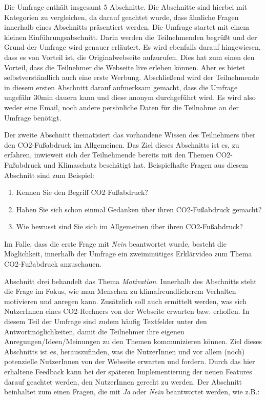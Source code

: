 Die Umfrage enthält insgesamt 5 Abschnitte.
Die Abschnitte sind hierbei mit Kategorien zu vergleichen, da darauf geachtet wurde, dass ähnliche Fragen innerhalb eines Abschnitts präsentiert werden.
Die Umfrage startet mit einem kleinen Einführungsabschnitt.
Darin werden die Teilnehmenden begrüßt und der Grund der Umfrage wird genauer erläutert.
Es wird ebenfalls darauf hingewiesen, dass es von Vorteil ist, die Originalwebseite aufzurufen.
Dies hat zum einen den Vorteil, dass die Teilnehmer die Webseite live erleben können.
Aber es bietet selbstverständlich auch eine erste Werbung.
Abschließend wird der Teilnehmende in diesem ersten Abschnitt darauf aufmerksam gemacht, dass die Umfrage ungefähr 30min dauern kann und diese anonym durchgeführt wird.
Es wird also weder eine Email, noch andere persönliche Daten für die Teilnahme an der Umfrage benötigt.

Der zweite Abschnitt thematisiert das vorhandene Wissen des Teilnehmers über den CO2-Fußabdruck im Allgemeinen.
Das Ziel dieses Abschnitts ist es, zu erfahren, inwieweit sich der Teilnehmende bereits mit den Themen CO2-Fußabdruck und Klimaschutz beschätigt hat.
Beispielhafte Fragen aus diesem Abschnitt sind zum Beispiel:

\begin{enumerate}
    \item Kennen Sie den Begriff CO2-Fußabdruck?
    \item Haben Sie sich schon einmal Gedanken über ihren CO2-Fußabdruck gemacht?
    \item Wie bewusst sind Sie sich im Allgemeinen über ihren CO2-Fußabdruck?
\end{enumerate}

Im Falle, dass die erste Frage mit \textit{Nein} beantwortet wurde, besteht die Möglichkeit, innerhalb der Umfrage ein zweiminütiges Erklärvideo zum Thema CO2-Fußabdruck anzuschauen.

Abschnitt drei behandelt das Thema \textit{Motivation}.
Innerhalb des Abschnitts steht die Frage im Fokus, wie man Menschen zu klimafreundlicherem Verhalten motivieren und anregen kann.
Zusätzlich soll auch ermittelt werden, was sich NutzerInnen eines CO2-Rechners von der Webseite erwarten bzw. erhoffen.
In diesem Teil der Umfrage sind zudem häufig Textfelder unter den Antwortmöglichkeiten, damit die Teilnehmer ihre eigenen Anregungen/Ideen/Meinungen zu den Themen kommunizieren können.
Ziel dieses Abschnitts ist es, herauszufinden, was die NutzerInnen und vor allem (noch) potenzielle NutzerInnen von der Webseite erwarten und fordern.
Durch das hier erhaltene Feedback kann bei der späteren Implementierung der neuen Features darauf geachtet werden, den NutzerInnen gerecht zu werden.
Der Abschnitt beinhaltet zum einen Fragen, die mit \textit{Ja} oder \textit{Nein} beantwortet werden, wie z.B.:

